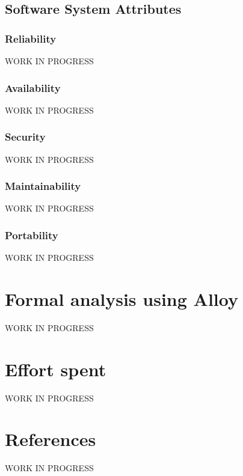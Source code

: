 \documentclass{report}
\begin{document}
		\section{Software System Attributes}
			\subsection{Reliability}
			WORK IN PROGRESS
			\subsection{Availability}
			WORK IN PROGRESS
			\subsection{Security}
			WORK IN PROGRESS
			\subsection{Maintainability}
			WORK IN PROGRESS
			\subsection{Portability}
			WORK IN PROGRESS
	\chapter{Formal analysis using Alloy}
	WORK IN PROGRESS
	\chapter{Effort spent}
	WORK IN PROGRESS
	\chapter{References}
	WORK IN PROGRESS
	
\end{document}
